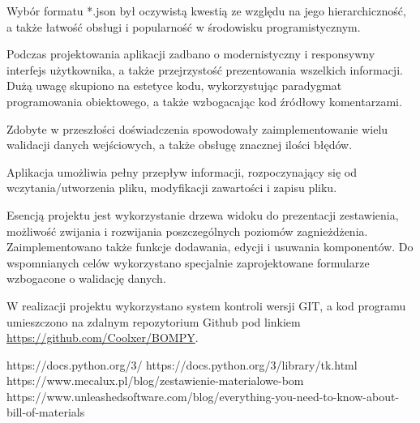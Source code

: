 \documentclass[12pt,twoside]{article}
\begin{document}
Wybór formatu *.json był oczywistą kwestią ze względu na jego hierarchiczność, a także łatwość obsługi i popularność w środowisku programistycznym.

Podczas projektowania aplikacji zadbano o modernistyczny i responsywny interfejs użytkownika, a także przejrzystość prezentowania wszelkich informacji. Dużą uwagę skupiono na estetyce kodu, wykorzystując paradygmat programowania obiektowego, a także wzbogacając kod źródłowy komentarzami.

Zdobyte w przeszłości doświadczenia spowodowały zaimplementowanie wielu walidacji danych wejściowych, a także obsługę znacznej ilości błędów.

Aplikacja umożliwia pełny przepływ informacji, rozpoczynający się od wczytania/utworzenia pliku, modyfikacji zawartości i zapisu pliku.

Esencją projektu jest wykorzystanie drzewa widoku do prezentacji zestawienia, możliwość zwijania i rozwijania poszczególnych poziomów zagnieżdżenia. Zaimplementowano także funkcje dodawania, edycji i usuwania komponentów. Do wspomnianych celów wykorzystano specjalnie zaprojektowane formularze wzbogacone o walidację danych.

W realizacji projektu wykorzystano system kontroli wersji GIT, a kod programu umieszczono na zdalnym repozytorium Github pod linkiem \url{https://github.com/Coolxer/BOMPY}.

\clearpage

\begin{thebibliography}{5}
 https://docs.python.org/3/
 https://docs.python.org/3/library/tk.html
 https://www.mecalux.pl/blog/zestawienie-materialowe-bom
 https://www.unleashedsoftware.com/blog/everything-you-need-to-know-about-bill-of-materials
\end{thebibliography}

\clearpage
\end{document}

